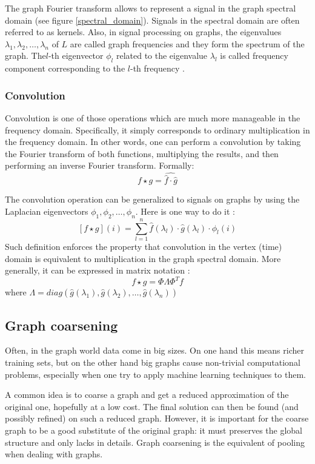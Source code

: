                 The graph Fourier transform allows to represent a signal in the graph spectral domain (see figure \ref{spectral_domain}). Signals in the spectral domain are often referred to as kernels. Also, in signal processing on graphs, the eigenvalues \(\lambda_1, \lambda_2, \dots, \lambda_n\) of \(L\) are called graph frequencies and they form the spectrum of the graph. The\(l\)-th eigenvector \(\phi_l\) related to the eigenvalue \(\lambda_l\) is called frequency component corresponding to the \(l\)-th frequency \cite{Sandryhaila}.
            \subsubsection{Convolution}
                Convolution is one of those operations which are much more manageable in the frequency domain. Specifically, it simply corresponds to ordinary multiplication in the frequency domain. In other words, one can perform a convolution by taking the Fourier transform of both functions, multiplying the results, and then performing an inverse Fourier transform. Formally:
                \[f \star g = \widehat{\hat{f} \cdot \hat{g}}\]
                
                The convolution operation can be generalized to signals on graphs by using the Laplacian eigenvectors \(\phi_1, \phi_2, \dots, \phi_n\). Here is one way to do it \cite{ShumanWindowed}:
                \[\left[f \star g\right]\left(i\right) = \sum_{l=1}^{n}\hat{f}\left(\lambda_l\right)\cdot\hat{g}\left(\lambda_l\right)\cdot\phi_l\left(i\right)\]
                Such definition enforces the property that convolution in the vertex (time) domain is equivalent to multiplication in the graph spectral domain. More generally, it can be expressed in matrix notation \cite{Defferrard}:
                \[f \star g = \Phi \Lambda \Phi^T f\]
                where \(\Lambda = diag\left(\hat{g}\left(\lambda_1\right), \hat{g}\left(\lambda_2\right), \dots, \hat{g}\left(\lambda_n\right)\right)\)
        \subsection{Graph coarsening}
            Often, in the graph world data come in big sizes. On one hand this means richer training sets, but on the other hand big graphs cause non-trivial computational problems, especially when one try to apply machine learning techniques to them.
            
            A common idea is to coarse a graph and get a reduced approximation of the original one, hopefully at a low cost. The final solution can then be found (and possibly refined) on such a reduced graph. However, it is important for the coarse graph to be a good substitute of the original graph: it must preserves the global structure and only lacks in details. Graph coarsening is the equivalent of pooling when dealing with graphs.
            

